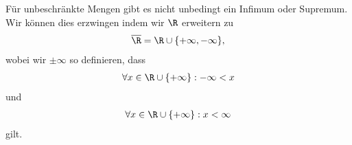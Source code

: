 \documentclass[letterpaper,10pt,english]{jupyterBook}
\begin{document}
Für unbeschränkte Mengen gibt es nicht unbedingt ein Infimum oder Supremum. Wir können dies erzwingen indem wir \(\R\) erweitern zu
\begin{equation*}
\begin{split} \overline{\R} = \R \cup \{+\infty,-\infty\},\end{split}
\end{equation*}
wobei wir \(\pm \infty\) so definieren, dass
\begin{equation*}
\begin{split} \forall x\in \R \cup \{+\infty\} : - \infty < x\end{split}
\end{equation*}
und
\begin{equation*}
\begin{split} \forall x\in \R \cup \{+\infty\} : x < \infty \end{split}
\end{equation*}
gilt.
\end{document}
